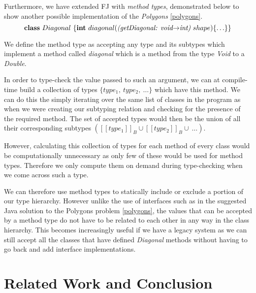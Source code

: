 \documentclass[runningheads]{llncs}
\begin{document}
Furthermore, we have extended FJ with \emph{method types}, demonstrated below to show another possible implementation of the \emph{Polygons} \autoref{polygons}.
$$
    \mathbf{class} \  Diagonal \ \{
    \mathbf{int}\ diagonal(\textit{(getDiagonal: void$\rightarrow$int)}  \ shape)\{\ldots\}
    \}
$$

We define the method type as accepting any type and its subtypes which implement a method called \emph{diagonal} which is a method from the type \emph{Void} to a \emph{Double}.

In order to type-check the value passed to such an argument, we can at compile-time build a collection of types $\{type_{1},\ type_{2},\ \ldots\}$ which have this method.
We can do this the simply iterating over the same list of classes in the program as when we were creating our subtyping relation and checking for the presence of the required method.
The set of accepted types would then be the union of all their corresponding subtypes $([\![type_{1}]\!]_{B} \cup [\![type_{2}]\!]_{B} \cup\ \ldots)$.

However, calculating this collection of types for each method of every class would be computationally unnecessary as only few of these would be used for method types.
Therefore we only compute them on demand during type-checking when we come across such a type.

We can therefore use method types to statically include or exclude a portion of our type hierarchy.
However unlike the use of interfaces such as in the suggested Java solution to the Polygons problem \autoref{polygons}, the values that can be accepted by a method type do not have to be related to each other in any way in the class hierarchy.
This becomes increasingly useful if we have a legacy system as we can still accept all the classes that have defined \emph{Diagonal} methods without having to go back and add interface implementations.


\section{Related Work and Conclusion}
\label{sec:conclusion}
\end{document}
